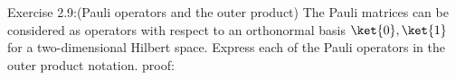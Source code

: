 {\Large Exercise 2.9:(Pauli operators and the outer product)}
The Pauli matrices can be considered as operators with respect to an orthonormal
basis $\ket{0}, \ket{1}$ for a two-dimensional Hilbert space.
Express each of the Pauli operators in the outer product notation.
\newline
{\large proof:} 
